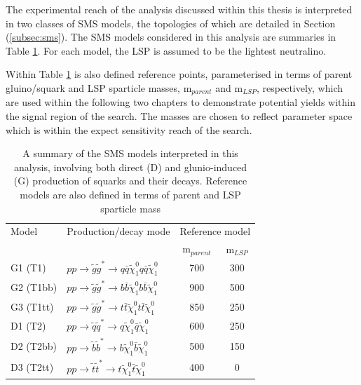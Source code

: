 The experimental reach of the analysis discussed within this thesis is interpreted in two classes of \ac{SMS} models, the topologies of which are detailed in Section (\ref{subsec:sms}). The \ac{SMS} models considered in this analysis are summaries in Table \ref{tab:sms_model_table}. For each model, the \ac{LSP} is assumed to be the lightest neutralino. 

Within Table \ref{tab:sms_model_table} is also defined reference points, parameterised in terms of parent gluino/squark and \ac{LSP} sparticle masses, m$_{parent}$ and m$_{LSP}$, respectively, which are used within the following two chapters to demonstrate potential yields within the signal region of the search. The masses are chosen to reflect parameter space which is within the expect sensitivity reach of the search.

\begin{table}[h!]
\begin{center}
\begin{tabular*}{0.75\textwidth}{@{\extracolsep{\fill}}llcc}
\cline{1-4}
Model & Production/decay mode &  \multicolumn{2}{c}{Reference model}\\ 
&& m$_{parent}$ & m$_{LSP}$ \\  \cline{1-4}
G1 (T1) & $ pp \rightarrow \widetilde{g}\widetilde{g}^{*} \rightarrow q\bar{q}\widetilde{\chi}^{0}_{1}q\bar{q}\widetilde{\chi}^{0}_{1}$ & 700 & 300 \\
G2 (T1bb) & $ pp \rightarrow \widetilde{g}\widetilde{g}^{*} \rightarrow b\bar{b}\widetilde{\chi}^{0}_{1}b\bar{b}\widetilde{\chi}^{0}_{1}$ & 900 & 500 \\
G3 (T1tt) & $ pp \rightarrow \widetilde{g}\widetilde{g}^{*} \rightarrow t\bar{t}\widetilde{\chi}^{0}_{1}t\bar{t}\widetilde{\chi}^{0}_{1}$ & 850 & 250 \\
D1 (T2) & $ pp \rightarrow \widetilde{q}\widetilde{q}^{*} \rightarrow q\widetilde{\chi}^{0}_{1}\bar{q}\widetilde{\chi}^{0}_{1}$ & 600 & 250 \\
D2 (T2bb) & $ pp \rightarrow \widetilde{b}\widetilde{b}^{*} \rightarrow b\widetilde{\chi}^{0}_{1}\bar{b}\widetilde{\chi}^{0}_{1}$ & 500 & 150 \\
D3 (T2tt) & $ pp \rightarrow \widetilde{t}\widetilde{t}^{*} \rightarrow t\widetilde{\chi}^{0}_{1}\bar{t}\widetilde{\chi}^{0}_{1}$ & 400 & 0 \\
\cline{1-4}
\end{tabular*}
\end{center}
\caption[A summary of the \ac{SMS} models interpreted in this analysis, involving both direct (D) and glunio-induced (G) production of squarks and their decays.]{A summary of the \ac{SMS} models interpreted in this analysis, involving both direct (D) and glunio-induced (G) production of squarks and their decays. Reference models are also defined in terms of parent and \ac{LSP} sparticle mass }
\label{tab:sms_model_table}
\end{table}


